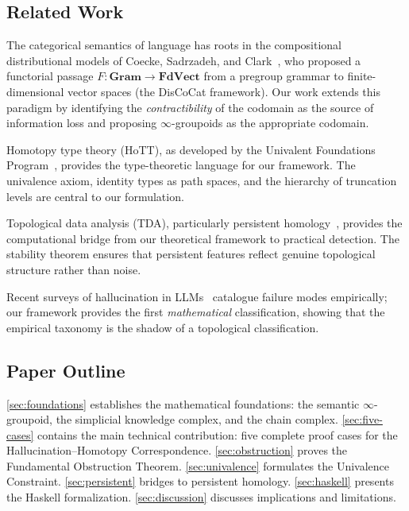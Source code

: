 \documentclass[11pt,a4paper]{article}
\theoremstyle{plain}
\theoremstyle{definition}
\theoremstyle{remark}
\begin{document}
\subsection{Related Work}

The categorical semantics of language has roots in the compositional distributional models of Coecke, Sadrzadeh, and Clark~\cite{coecke2010}, who proposed a functorial passage $F: \mathbf{Gram} \to \mathbf{FdVect}$ from a pregroup grammar to finite-dimensional vector spaces (the DisCoCat framework). Our work extends this paradigm by identifying the \emph{contractibility} of the codomain as the source of information loss and proposing $\infty$-groupoids as the appropriate codomain.

Homotopy type theory (HoTT), as developed by the Univalent Foundations Program~\cite{hottbook}, provides the type-theoretic language for our framework. The univalence axiom, identity types as path spaces, and the hierarchy of truncation levels are central to our formulation.

Topological data analysis (TDA), particularly persistent homology~\cite{edelsbrunner2010}, provides the computational bridge from our theoretical framework to practical detection. The stability theorem ensures that persistent features reflect genuine topological structure rather than noise.

Recent surveys of hallucination in LLMs~\cite{huang2023,ji2023} catalogue failure modes empirically; our framework provides the first \emph{mathematical} classification, showing that the empirical taxonomy is the shadow of a topological classification.

\subsection{Paper Outline}

\cref{sec:foundations} establishes the mathematical foundations: the semantic $\infty$-groupoid, the simplicial knowledge complex, and the chain complex. \cref{sec:five-cases} contains the main technical contribution: five complete proof cases for the Hallucination--Homotopy Correspondence. \cref{sec:obstruction} proves the Fundamental Obstruction Theorem. \cref{sec:univalence} formulates the Univalence Constraint. \cref{sec:persistent} bridges to persistent homology. \cref{sec:haskell} presents the Haskell formalization. \cref{sec:discussion} discusses implications and limitations.


\end{document}
